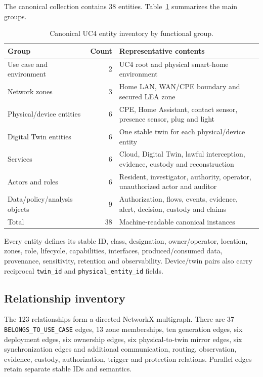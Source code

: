 ﻿\documentclass[11pt,a4paper]{article}
\newcommand{\code}[1]{\texttt{#1}}
\begin{document}
The canonical collection contains 38 entities. Table~\ref{tab:entities} summarizes the main groups.

\begin{table}[H]
\centering
\caption{Canonical UC4 entity inventory by functional group.}
\label{tab:entities}
\begin{tabularx}{\textwidth}{@{}l r X@{}}
\toprule
Group & Count & Representative contents \\
\midrule
Use case and environment & 2 & UC4 root and physical smart-home environment \\
Network zones & 3 & Home LAN, WAN/CPE boundary and secured LEA zone \\
Physical/device entities & 6 & CPE, Home Assistant, contact sensor, presence sensor, plug and light \\
Digital Twin entities & 6 & One stable twin for each physical/device entity \\
Services & 6 & Cloud, Digital Twin, lawful interception, evidence, custody and reconstruction \\
Actors and roles & 6 & Resident, investigator, authority, operator, unauthorized actor and auditor \\
Data/policy/analysis objects & 9 & Authorization, flows, events, evidence, alert, decision, custody and claims \\
\midrule
Total & 38 & Machine-readable canonical instances \\
\bottomrule
\end{tabularx}
\end{table}

Every entity defines its stable ID, class, designation, owner/operator, location, zones, role, lifecycle, capabilities, interfaces, produced/consumed data, provenance, sensitivity, retention and observability. Device/twin pairs also carry reciprocal \code{twin\_id} and \code{physical\_entity\_id} fields.

\subsection{Relationship inventory}

The 123 relationships form a directed NetworkX multigraph. There are 37 \code{BELONGS\_TO\_USE\_CASE} edges, 13 zone memberships, ten generation edges, six deployment edges, six ownership edges, six physical-to-twin mirror edges, six synchronization edges and additional communication, routing, observation, evidence, custody, authorization, trigger and protection relations. Parallel edges retain separate stable IDs and semantics.
\end{document}
